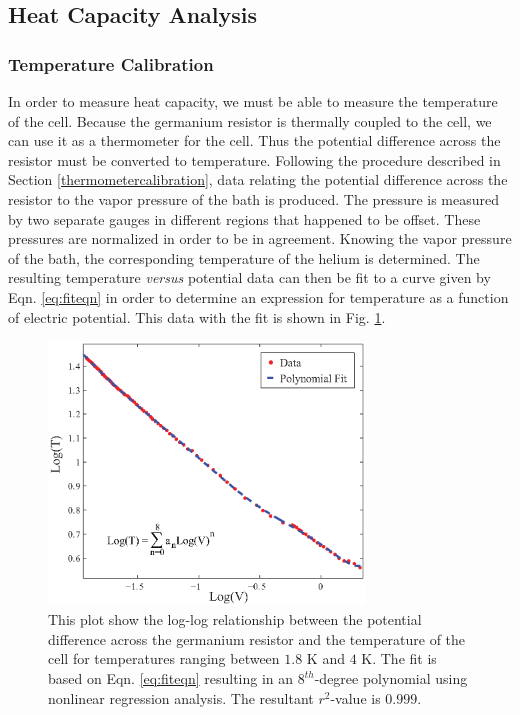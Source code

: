 \subsection{Heat Capacity Analysis}\label{heatcapacityanalysis}
\subsubsection{Temperature Calibration}\label{temperaturecalibration}

In order to measure heat capacity, we must be able to measure the temperature of the cell.  Because the germanium resistor is thermally coupled to the cell, we can use it as a thermometer for the cell.  Thus the potential difference across the resistor must be converted to temperature.  Following the procedure described in Section \ref{thermometercalibration}, data relating the potential difference across the resistor to the vapor pressure of the bath is produced.  The pressure is measured by two separate gauges in different regions that happened to be offset.  These pressures are normalized in order to be in agreement.  Knowing the vapor pressure of the bath, the corresponding temperature of the helium is determined. The resulting temperature \emph{versus} potential data can then be fit to a curve given by Eqn. \ref{eq:fiteqn} in order to determine an expression for temperature as a function of electric potential.  This data with the fit is shown in Fig. \ref{fig:polyfit}.  
\begin{figure}[htbp]
\begin{center}
\includegraphics[height=70mm]{./figures/polyfit.eps}
\caption{\small{This plot show the log-log relationship between the potential difference across the germanium resistor and the temperature of the cell for temperatures ranging between $1.8$ K and $4$ K.  The fit is based on Eqn. \ref{eq:fiteqn} resulting in an $8^{th}$-degree polynomial using nonlinear regression analysis.  The resultant $r^{2}$-value is $0.999$.}}
\label{fig:polyfit}
\end{center}
\end{figure}

